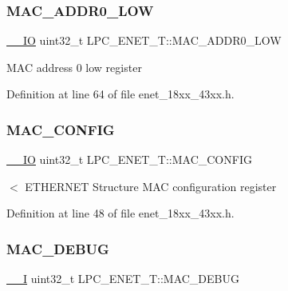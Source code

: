 \subsubsection{\texorpdfstring{M\+A\+C\+\_\+\+A\+D\+D\+R0\+\_\+\+L\+OW}{MAC\_ADDR0\_LOW}}
{\footnotesize\ttfamily \hyperlink{core__sc300_8h_aec43007d9998a0a0e01faede4133d6be}{\+\_\+\+\_\+\+IO} uint32\+\_\+t L\+P\+C\+\_\+\+E\+N\+E\+T\+\_\+\+T\+::\+M\+A\+C\+\_\+\+A\+D\+D\+R0\+\_\+\+L\+OW}

M\+AC address 0 low register 

Definition at line 64 of file enet\+\_\+18xx\+\_\+43xx.\+h.

\mbox{\label{struct_l_p_c___e_n_e_t___t_aa54e5cb311bed5d6b7cec2bacdf2166e}} 
\subsubsection{\texorpdfstring{M\+A\+C\+\_\+\+C\+O\+N\+F\+IG}{MAC\_CONFIG}}
{\footnotesize\ttfamily \hyperlink{core__sc300_8h_aec43007d9998a0a0e01faede4133d6be}{\+\_\+\+\_\+\+IO} uint32\+\_\+t L\+P\+C\+\_\+\+E\+N\+E\+T\+\_\+\+T\+::\+M\+A\+C\+\_\+\+C\+O\+N\+F\+IG}

$<$ E\+T\+H\+E\+R\+N\+ET Structure M\+AC configuration register 

Definition at line 48 of file enet\+\_\+18xx\+\_\+43xx.\+h.

\mbox{\label{struct_l_p_c___e_n_e_t___t_a6d7cea1b61d5661353263df4d5873643}} 
\subsubsection{\texorpdfstring{M\+A\+C\+\_\+\+D\+E\+B\+UG}{MAC\_DEBUG}}
{\footnotesize\ttfamily \hyperlink{core__sc300_8h_af63697ed9952cc71e1225efe205f6cd3}{\+\_\+\+\_\+I} uint32\+\_\+t L\+P\+C\+\_\+\+E\+N\+E\+T\+\_\+\+T\+::\+M\+A\+C\+\_\+\+D\+E\+B\+UG}

